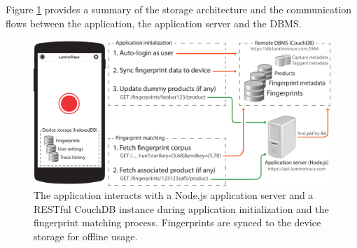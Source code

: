\documentclass[thesis.tex]{subfiles}
\begin{document}
Figure \ref{figure:application-database-flow} provides a summary of the storage architecture and the communication flows between the application, the application server and the DBMS.

\begin{figure}[h]
\centering \includegraphics[width=\textwidth,height=\textheight,keepaspectratio=true]{images/design_implementation/application_database_flow}
\caption{The application interacts with a Node.js application server and a RESTful CouchDB instance during application initialization and the fingerprint matching process. Fingerprints are synced to the device storage for offline usage.\label{figure:application-database-flow}}
\end{figure}
\end{document}
